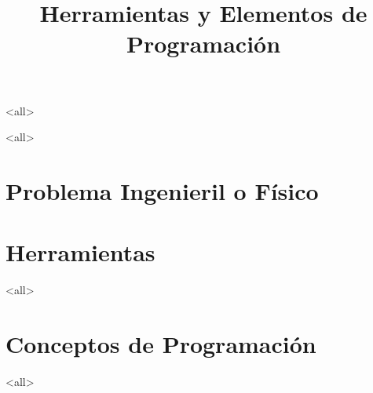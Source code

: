 \mode<all>









\title{
    Herramientas y Elementos de Programación}
\subject{Introducción a la Materia. Repaso de elementos de Programación.}





\mode<all>

\section{Problema Ingenieril o Físico}



\section{Herramientas}



\mode<all>
\section{Conceptos de Programación}


\mode<all>


